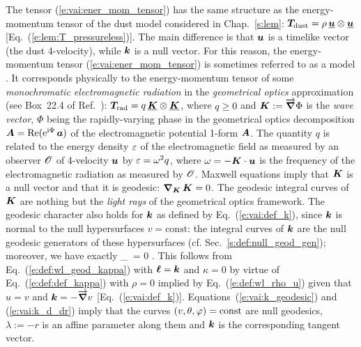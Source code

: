 The tensor (\ref{e:vai:ener_mom_tensor}) has the same
structure as the energy-momentum tensor of the dust model considered in Chap.~\ref{s:lem}:
$\bm{T}_{\rm dust} = \rho  \, \underline{\bm{u}} \otimes \underline{\bm{u}} $ [Eq.~(\ref{e:lem:T_pressureless})].
The main difference is that $\bm{u}$ is a timelike vector (the dust 4-velocity), while
$\bm{k}$ is a null vector. For this reason, the energy-momentum tensor  (\ref{e:vai:ener_mom_tensor})
is sometimes referred to as a  model \cite{Poiss04}.
It corresponds physically to the energy-momentum tensor of some \emph{monochromatic electromagnetic radiation} in the
\emph{geometrical optics} approximation (see Box~22.4 of Ref.~\cite{MisneTW73}):
$\bm{T}_{\rm rad} = q  \, \underline{\bm{K}} \otimes \underline{\bm{K}}$, where $q\geq 0$ and $\bm{K} := \overrightarrow{\bm{\nabla}}\Phi$ is the \emph{wave vector}, $\Phi$ being the rapidly-varying
phase in the geometrical optics decomposition $\bm{A} = \mathrm{Re}(\mathrm{e}^{\mathrm{i}\Phi} \, \bm{a})$ of the electromagnetic potential 1-form $\bm{A}$. The quantity $q$ is related to the energy density
$\varepsilon$ of the electromagnetic field as measured by an observer $\mathscr{O}$ of 4-velocity $\bm{u}$
by $\varepsilon = \omega^2 q$, where $\omega = - \bm{K}\cdot\bm{u}$ is the frequency of the electromagnetic
radiation as measured by $\mathscr{O}$.
Maxwell equations imply that $\bm{K}$ is a null vector and that it is geodesic:
$\bm{\nabla}_{\bm{K}}\, \bm{K} = 0$. The geodesic integral curves of $\bm{K}$ are nothing but
the \emph{light rays} of the geometrical optics framework.
The geodesic character also holds for $\bm{k}$ as defined by Eq.~(\ref{e:vai:def_k}),
since $\bm{k}$ is normal to the null hypersurfaces $v = \mathrm{const}$:
the integral curves of $\bm{k}$ are the null geodesic generators of these hypersurfaces
(cf. Sec.~\ref{s:def:null_geod_gen}); moreover,
we have exactly
\be \label{e:vai:k_geodesic}
    \w{\nabla}_{}\,  = 0 .
\ee
This follows from Eq.~(\ref{e:def:wl_geod_kappa}) with $\bm{\ell} = \bm{k}$ and $\kappa = 0$
by virtue of Eq.~(\ref{e:def:def_kappa}) with $\rho=0$ implied by
Eq.~(\ref{e:def:wl_rho_u}) given that $u = v$ and $\bm{k} =  - \overrightarrow{\bm{\nabla}} v$ [Eq.~(\ref{e:vai:def_k})].
Equations~(\ref{e:vai:k_geodesic}) and (\ref{e:vai:k_d_dr})
imply that the curves $(v,\theta,\varphi) = \mathrm{const}$
are null geodesics, $\lambda:=-r$ is an affine parameter along them and $\bm{k}$ is
the corresponding tangent vector.

